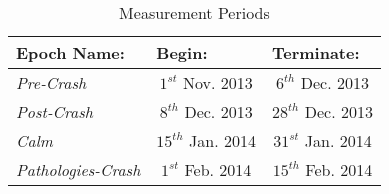 






\begin{table}
\centering
\caption{Measurement Periods}
\label{table:my-label}
\begin{tabular}{|l|c|c|}
\hline
\textbf{Epoch Name:}            & \multicolumn{1}{l|}{\textbf{Begin:}} & \multicolumn{1}{l|}{\textbf{Terminate:}} \\ \hline
\textit{Pre-Crash}         & $1^{st}$ Nov. 2013                          & $6^{th}$ Dec. 2013                              \\ \hline
\textit{Post-Crash}        & $8^{th}$ Dec. 2013                          & $28^{th}$ Dec. 2013                             \\ \hline
\textit{Calm}              & $15^{th}$ Jan. 2014                         & $31^{st}$ Jan. 2014                             \\ \hline
\textit{Pathologies-Crash} & $1^{st}$ Feb. 2014                          & $15^{th}$ Feb. 2014                             \\ \hline
\end{tabular}
\end{table}









